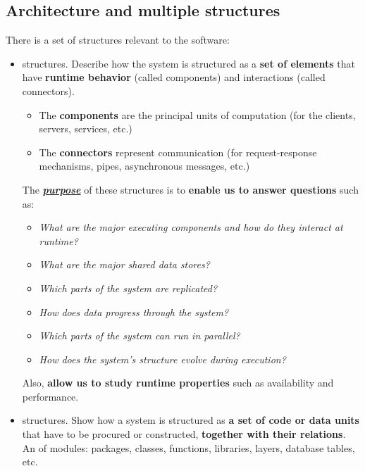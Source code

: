 \subsection{Architecture and multiple structures}

There is a set of structures relevant to the software:
\begin{itemize}
    \item {} structures. Describe how the system is structured as a \textbf{set of elements} that have \textbf{runtime behavior} (called components) and interactions (called connectors).
    \begin{itemize}
        \item The \textbf{components} are the principal units of computation (for  the clients, servers, services, etc.)

        \item The \textbf{connectors} represent communication (for  request-response mechanisms, pipes, asynchronous messages, etc.)
    \end{itemize}
    The \emph{\textbf{\underline{purpose}}} of these structures is to \textbf{enable us to answer questions} such as:
    \begin{itemize}
        \item \emph{What are the major executing components and how do they interact at runtime?}

        \item \emph{What are the major shared data stores?}
        
        \item \emph{Which parts of the system are replicated?}

        \item \emph{How does data progress through the system?}

        \item \emph{Which parts of the system can run in parallel?}

        \item \emph{How does the system's structure evolve during execution?}
    \end{itemize}
    Also, \textbf{allow us to study runtime properties} such as availability and performance.

    \item {} structures. Show how a system is structured as \textbf{a set of code or data units} that have to be procured or constructed, \textbf{together with their relations}. An  of modules: packages, classes, functions, libraries, layers, database tables, etc.
    

\end{itemize}

